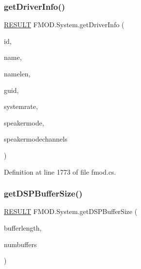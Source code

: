 \mbox{\label{class_f_m_o_d_1_1_system_ae1b48e7caf6d3459a537d7a61587bccf}} 
\subsubsection{\texorpdfstring{get\+Driver\+Info()}{getDriverInfo()}}
{\footnotesize\ttfamily \hyperlink{namespace_f_m_o_d_a305d1176ef3f8c8815861a60407ac33d}{R\+E\+S\+U\+LT} F\+M\+O\+D.\+System.\+get\+Driver\+Info (\begin{DoxyParamCaption}\item[{int}]{id,  }\item[{String\+Builder}]{name,  }\item[{int}]{namelen,  }\item[{out Guid}]{guid,  }\item[{out int}]{systemrate,  }\item[{out \hyperlink{namespace_f_m_o_d_aa0732e7e8efd3b96b526a7f2f8479634}{S\+P\+E\+A\+K\+E\+R\+M\+O\+DE}}]{speakermode,  }\item[{out int}]{speakermodechannels }\end{DoxyParamCaption})}



Definition at line 1773 of file fmod.\+cs.

\mbox{\label{class_f_m_o_d_1_1_system_a2a4dafa899dcdf27816edaaa4633f17e}} 
\subsubsection{\texorpdfstring{get\+D\+S\+P\+Buffer\+Size()}{getDSPBufferSize()}}
{\footnotesize\ttfamily \hyperlink{namespace_f_m_o_d_a305d1176ef3f8c8815861a60407ac33d}{R\+E\+S\+U\+LT} F\+M\+O\+D.\+System.\+get\+D\+S\+P\+Buffer\+Size (\begin{DoxyParamCaption}\item[{out uint}]{bufferlength,  }\item[{out int}]{numbuffers }\end{DoxyParamCaption})}



